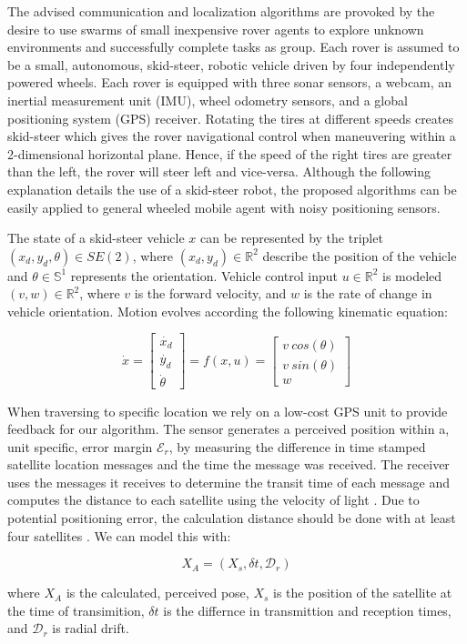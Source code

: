 The advised communication and localization algorithms are provoked by the desire to use swarms of small inexpensive rover agents to explore unknown environments and successfully complete tasks as group. Each rover is assumed to be a small, autonomous, skid-steer, robotic vehicle driven by four independently powered wheels. Each rover is equipped with three sonar sensors, a webcam, an inertial measurement unit (IMU), wheel odometry sensors, and a global positioning system (GPS) receiver. Rotating the tires at different speeds creates skid-steer which gives the rover navigational control when maneuvering within a 2-dimensional horizontal plane. Hence, if the speed of the right tires are greater than the left, the rover will steer left and vice-versa. Although the following explanation details the use of a skid-steer robot, the proposed algorithms can be easily applied to general wheeled mobile agent with noisy positioning sensors.

The state of a skid-steer vehicle $x$ can be represented by the triplet $(x_d, y_d, \theta) \in SE(2)$, where $(x_d, y_d) \in \mathbb{R}^2$ describe the position of the vehicle and $\theta \in \mathbb{S}^1$ represents the orientation. Vehicle control input $u \in \mathbb{R}^2$ is modeled $(v, w) \in \mathbb{R}^2$, where $v$ is the forward velocity, and $w$ is the rate of change in vehicle orientation. Motion evolves according the following kinematic equation:

\begin{equation} \label{skid-steer}
	\dot{x} = 
	\begin{bmatrix}
	\dot{x_d} \\ \dot{y_d} \\ \dot{\theta}
	\end{bmatrix}
	= f(x, u) = 
	\begin{bmatrix}
	v~cos(\theta) \\ v~sin(\theta) \\ w 
	\end{bmatrix}
\end{equation}

When traversing to specific location we rely on a low-cost GPS unit to provide feedback for our algorithm. The sensor generates a perceived position within a, unit specific, error margin $\mathcal{E}_r$, by measuring the difference in time stamped satellite location messages and the time the message was received.  The receiver uses the messages it receives to determine the transit time of each message and computes the distance to each satellite using the velocity of light \cite{rahemi2014accurate}. Due to potential positioning error, the calculation distance should be done with at least four satellites \cite{rahemi2014accurate}. We can model this with:

\begin{equation}
	X_A= (X_s, \delta t, \mathcal{D}_r)
\end{equation}

where $X_A$ is the calculated, perceived pose, $X_s$ is the position of the satellite at the time of transimition, $\delta t$ is the differnce in transmittion and reception times, and $\mathcal{D}_r$ is radial drift.